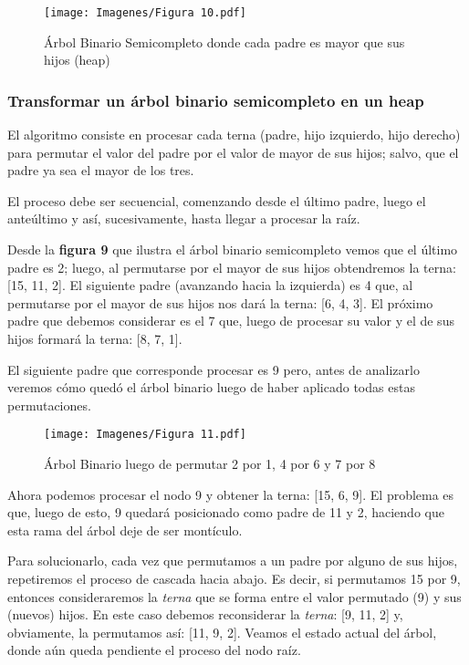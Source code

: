 \documentclass[12pt]{article}
\begin{document}
\begin{figure}[H]
   \centering
   \texttt{[image: Imagenes/Figura 10.pdf]}
   \caption{Árbol Binario Semicompleto donde cada padre es mayor que sus hijos (heap)}
   \label{fig_label2}
\end{figure}

\subsubsection{Transformar un árbol binario semicompleto en un heap}

El algoritmo consiste en procesar cada terna (padre, hijo izquierdo, hijo derecho) para permutar el valor del padre por el valor de mayor de sus hijos; salvo, que el padre ya sea el mayor de los tres.

El proceso debe ser secuencial, comenzando desde el último padre, luego el anteúltimo y así, sucesivamente, hasta llegar a procesar la raíz.

Desde la \textbf{figura 9} que ilustra el árbol binario semicompleto vemos que el último padre es 2; luego, al permutarse por el mayor de sus hijos obtendremos la terna: [15, 11, 2]. El siguiente padre (avanzando hacia la izquierda) es 4 que, al permutarse por el mayor de sus hijos nos dará la terna: [6, 4, 3]. El próximo padre que debemos considerar es el 7 que, luego de procesar su valor y el de sus hijos formará la terna: [8, 7, 1].

El siguiente padre que corresponde procesar es 9 pero, antes de analizarlo veremos cómo quedó el árbol binario luego de haber aplicado todas estas permutaciones.

\begin{figure}[H]
   \centering
   \texttt{[image: Imagenes/Figura 11.pdf]}
   \caption{Árbol Binario luego de permutar 2 por 1, 4 por 6 y 7 por 8}
   \label{fig_label3}
\end{figure}

Ahora podemos procesar el nodo 9 y obtener la terna: [15, 6, 9]. El problema es que, luego de esto, 9 quedará posicionado como padre de 11 y 2, haciendo que esta rama del árbol deje de ser montículo.

Para solucionarlo, cada vez que permutamos a un padre por alguno de sus hijos, repetiremos el proceso de cascada hacia abajo. Es decir, si permutamos 15 por 9, entonces consideraremos la \textit{terna} que se forma entre el valor permutado (9) y sus (nuevos) hijos. En este caso debemos reconsiderar la \textit{terna}: [9, 11, 2] y, obviamente, la permutamos así: [11, 9, 2]. Veamos el estado actual del árbol, donde aún queda pendiente el proceso del nodo raíz.
\end{document}
